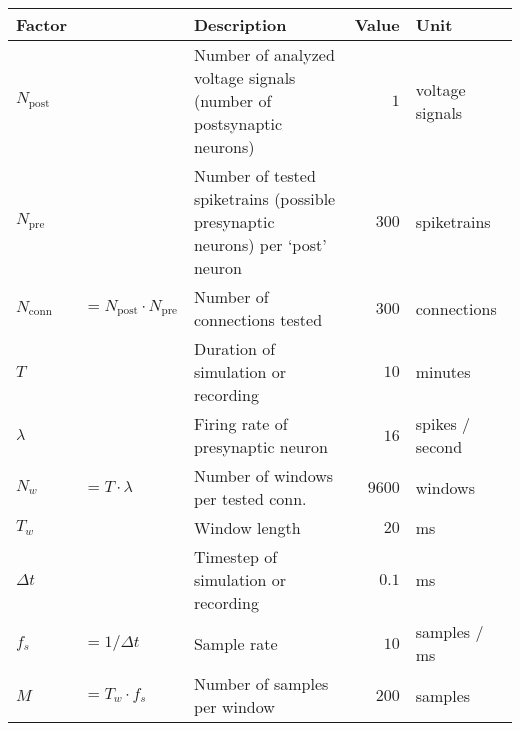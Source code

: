 \begin{tabular}{l l l r l}
    Factor &               & Description                           & Value  & Unit            \\
    \toprule
    $ N_\mathrm{post} $&$ $& \makecell[l]{Number of analyzed voltage signals\\
        (number of postsynaptic neurons)}                          &$   1  $& voltage signals \\[0.8em]

    $ N_\mathrm{pre}  $&$ $& \makecell[l]{Number of tested spiketrains (possible\\
        presynaptic neurons) per `post' neuron }                   &$ 300  $& spiketrains     \\[0.8em]

    $ N_\mathrm{conn} $&$ = N_\mathrm{post} · N_\mathrm{pre} $&
        Number of connections tested                               &$ 300  $& connections     \\

    \midrule
    $ T   $&$             $& Duration of simulation or recording   &$  10  $& minutes         \\
    $ λ   $&$             $& Firing rate of presynaptic neuron     &$  16  $& spikes / second \\
    $ N_w $&$ = T · λ     $& Number of windows per tested conn.    &$ 9600 $& windows         \\
    \midrule
    $ T_w $&$             $& Window length                         &$  20  $& ms              \\
    $ Δt  $&$             $& Timestep of simulation or recording   &$  0.1 $& ms              \\
    $ f_s $&$ = 1 / Δt    $& Sample rate                           &$  10  $& samples / ms    \\
    $ M   $&$ = T_w · f_s $& Number of samples per window          &$  200 $& samples         \\
    \bottomrule
\end{tabular}
